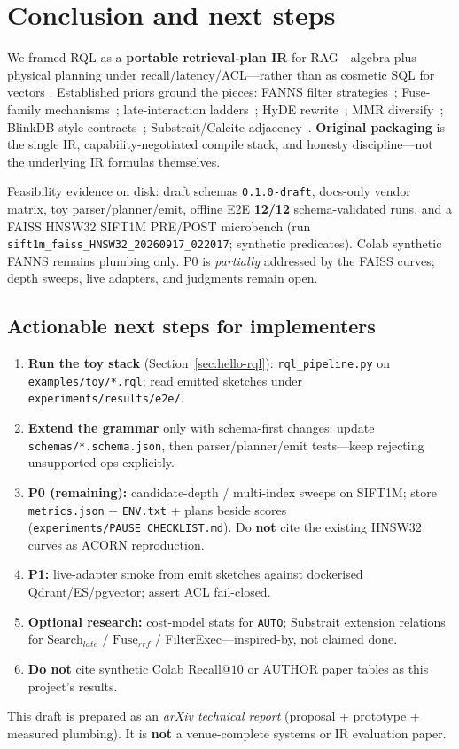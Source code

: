 \section{Conclusion and next steps}
\label{sec:conclusion}

We framed RQL as a \textbf{portable retrieval-plan IR} for RAG---algebra plus physical planning under recall/latency/ACL---rather than as cosmetic SQL for vectors \hypothesis{}.
Established priors ground the pieces: FANNS filter strategies~\citep{lin2025fanns,patel2024acorn,zhang2023vbase,gollapudi2023filtered}; Fuse-family mechanisms~\citep{cormack2009rrf,montague2002condorcet,bruch2023fusion,chen2022ood}; late-interaction ladders~\citep{khattab2020colbert,santhanam2022plaid,jayaram2024muvera}; HyDE rewrite~\citep{gao2023hyde}; MMR diversify~\citep{carbonell1998mmr}; BlinkDB-style contracts~\citep{agarwal2013blinkdb}; Substrait/Calcite adjacency~\citep{substrait,begoli2018calcite}.
\textbf{Original packaging} is the single IR, capability-negotiated compile stack, and honesty discipline---not the underlying IR formulas themselves.

Feasibility evidence on disk: draft schemas \texttt{0.1.0-draft}, docs-only vendor matrix, toy parser/planner/emit, offline E2E \textbf{12/12} schema-validated runs, and a FAISS HNSW32 SIFT1M PRE/POST microbench (run \texttt{sift1m\_faiss\_HNSW32\_20260917\_022017}; synthetic predicates).
Colab synthetic FANNS remains plumbing only.
P0 is \emph{partially} addressed by the FAISS curves; depth sweeps, live adapters, and judgments remain open.

\subsection{Actionable next steps for implementers}
\begin{enumerate}[leftmargin=*]
  \item \textbf{Run the toy stack} (Section~\ref{sec:hello-rql}): \texttt{rql\_pipeline.py} on \texttt{examples/toy/*.rql}; read emitted sketches under \texttt{experiments/results/e2e/}.
  \item \textbf{Extend the grammar} only with schema-first changes: update \texttt{schemas/*.schema.json}, then parser/planner/emit tests---keep rejecting unsupported ops explicitly.
  \item \textbf{P0 (remaining):} candidate-depth / multi-index sweeps on SIFT1M; store \texttt{metrics.json} + \texttt{ENV.txt} + plans beside scores (\texttt{experiments/PAUSE\_CHECKLIST.md}). Do \textbf{not} cite the existing HNSW32 curves as ACORN reproduction.
  \item \textbf{P1:} live-adapter smoke from emit sketches against dockerised Qdrant/ES/pgvector; assert ACL fail-closed.
  \item \textbf{Optional research:} cost-model stats for \texttt{AUTO}; Substrait extension relations for $\mathrm{Search}_{late}$ / $\mathrm{Fuse}_{rrf}$ / FilterExec---inspired-by, not claimed done.
  \item \textbf{Do not} cite synthetic Colab Recall@$10$ or AUTHOR paper tables as this project's results.
\end{enumerate}

This draft is prepared as an \emph{arXiv technical report} (proposal + prototype + measured plumbing).
It is \textbf{not} a venue-complete systems or IR evaluation paper.
